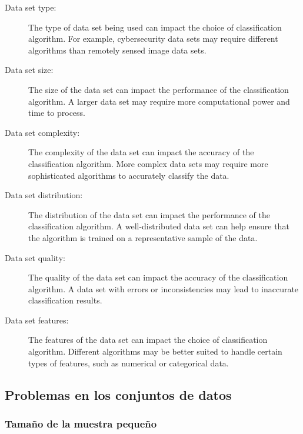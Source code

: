 \documentclass[12pt,a4paper, brazil]{article}
\begin{document}
    \begin{description}
  \item[Data set type:] The type of data set being used can impact the choice of classification algorithm. For example, cybersecurity data sets may require different algorithms than remotely sensed image data sets.
  
  \item[Data set size:] The size of the data set can impact the performance of the classification algorithm. A larger data set may require more computational power and time to process.
  
  \item[Data set complexity:] The complexity of the data set can impact the accuracy of the classification algorithm. More complex data sets may require more sophisticated algorithms to accurately classify the data.
  
  \item[Data set distribution:] The distribution of the data set can impact the performance of the classification algorithm. A well-distributed data set can help ensure that the algorithm is trained on a representative sample of the data.
  
  \item[Data set quality:] The quality of the data set can impact the accuracy of the classification algorithm. A data set with errors or inconsistencies may lead to inaccurate classification results.
  
  \item[Data set features:] The features of the data set can impact the choice of classification algorithm. Different algorithms may be better suited to handle certain types of features, such as numerical or categorical data.
\end{description} \cite{8947945}

    \subsection{Problemas en los conjuntos de datos}
        \subsubsection{Tamaño de la muestra pequeño}
        
\end{document}
